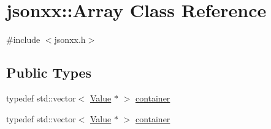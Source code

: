 \hypertarget{classjsonxx_1_1_array}{}\section{jsonxx\+:\+:Array Class Reference}
\label{classjsonxx_1_1_array}


{\ttfamily \#include $<$jsonxx.\+h$>$}

\subsection*{Public Types}
\begin{DoxyCompactItemize}
\item 
typedef std\+::vector$<$ \hyperlink{classjsonxx_1_1_value}{Value} $\ast$ $>$ \hyperlink{classjsonxx_1_1_array_a1bc01c9ef6a589c435c1b721d9922255}{container}
\item 
typedef std\+::vector$<$ \hyperlink{classjsonxx_1_1_value}{Value} $\ast$ $>$ \hyperlink{classjsonxx_1_1_array_a1bc01c9ef6a589c435c1b721d9922255}{container}
\end{DoxyCompactItemize}
